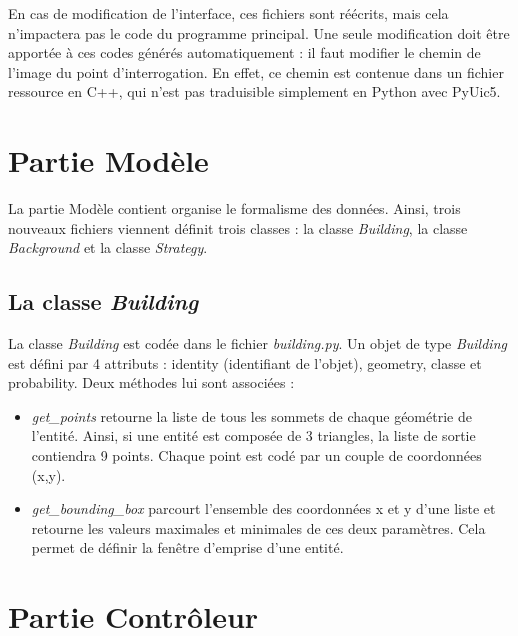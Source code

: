 En cas de modification de l'interface, ces fichiers sont réécrits, mais cela n'impactera pas le code du programme principal. Une seule modification doit être apportée à ces codes générés automatiquement : il faut modifier le chemin de l'image du point d'interrogation. En effet, ce chemin est contenue dans un fichier ressource en C++, qui n'est pas traduisible simplement en Python avec PyUic5. 

\section{Partie Modèle}

La partie Modèle contient organise le formalisme des données. Ainsi, trois nouveaux fichiers viennent définit trois classes : la classe \textit{Building}, la classe \textit{Background} et la classe \textit{Strategy}.\\

\subsection{La classe \textit{Building}}

La classe \textit{Building} est codée dans le fichier \textit{building.py}. Un objet de type \textit{Building} est défini par 4 attributs : identity (identifiant de l'objet), geometry, classe et probability. Deux méthodes lui sont associées : 
\begin{itemize}
	\item \textit{get\_points} retourne la liste de tous les sommets de chaque géométrie de l'entité. Ainsi, si une entité est composée de 3 triangles, la liste de sortie contiendra 9 points. Chaque point est codé par un couple de coordonnées (x,y).
	\item \textit{get\_bounding\_box} parcourt l'ensemble des coordonnées x et y d'une liste et retourne les valeurs maximales et minimales de ces deux paramètres. Cela permet de définir la fenêtre d'emprise d'une entité.
\end{itemize}


\section{Partie Contrôleur}